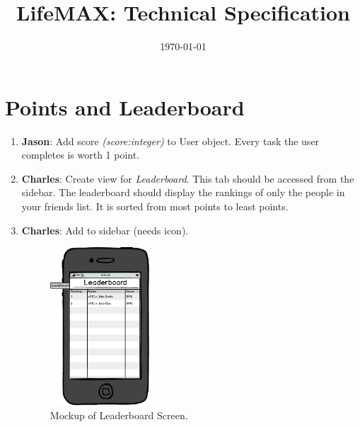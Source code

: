 \documentclass[12pt]{article}
\begin{document}

\title{LifeMAX: Technical Specification}
\date{\today}

\maketitle

\section{Points and Leaderboard}

\begin{enumerate}
\item \textbf{Jason}: Add score \emph{(score:integer)} to User object.  Every task the user completes is worth 1 point.
\item \textbf{Charles}: Create view for \emph{Leaderboard}.  This tab should be accessed from the sidebar.  The leaderboard should display the rankings of only the people in your friends list.  It is sorted from most points to least points.
\item \textbf{Charles}: Add to sidebar (needs icon).

\begin{figure}[htbp]
    \centering
    \includegraphics[width=0.35\textwidth]{leaderboard.png}
    \caption{Mockup of Leaderboard Screen.}
    \label{fig:leaderboard}
\end{figure}

\end{enumerate}
\end{document}
